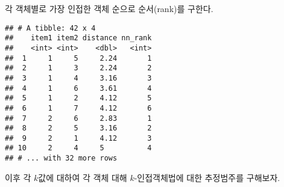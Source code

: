 \documentclass[]{book}
\newenvironment{Shaded}{\begin{snugshade}}{\end{snugshade}}
\newcommand{\DataTypeTok}[1]{\textcolor[rgb]{0.13,0.29,0.53}{#1}}
\newcommand{\KeywordTok}[1]{\textcolor[rgb]{0.13,0.29,0.53}{\textbf{#1}}}
\newcommand{\NormalTok}[1]{#1}
\newcommand{\OperatorTok}[1]{\textcolor[rgb]{0.81,0.36,0.00}{\textbf{#1}}}
\newcommand{\StringTok}[1]{\textcolor[rgb]{0.31,0.60,0.02}{#1}}
\begin{document}
각 객체별로 가장 인접한 객체 순으로 순서(rank)를 구한다.

\begin{Shaded}
\end{Shaded}

\begin{verbatim}
## # A tibble: 42 x 4
##    item1 item2 distance nn_rank
##    <int> <int>    <dbl>   <int>
##  1     1     5     2.24       1
##  2     1     3     2.24       2
##  3     1     4     3.16       3
##  4     1     6     3.61       4
##  5     1     2     4.12       5
##  6     1     7     4.12       6
##  7     2     6     2.83       1
##  8     2     5     3.16       2
##  9     2     1     4.12       3
## 10     2     4     5          4
## # ... with 32 more rows
\end{verbatim}

이후 각 \(k\)값에 대하여 각 객체 대해 \(k\)-인접객체법에 대한 추정범주를 구해보자.
\end{document}

